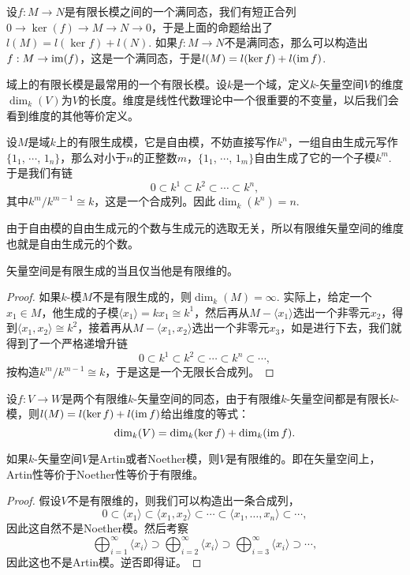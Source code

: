 设$f:M\to N$是有限长模之间的一个满同态，我们有短正合列$0\to \ker(f)\to M\to N\to 0$，于是上面的命题给出了$l(M)=l(\ker f)+l(N)$. 如果$f:M\to N$不是满同态，那么可以构造出$f:M\to \operatorname{im}(f)$，这是一个满同态，于是$l(M)=l(\ker f)+l(\operatorname{im} f)$. 

\para[矢量空间维度] 域上的有限长模是最常用的一个有限长模。设$k$是一个域，定义$k$-矢量空间$V$的维度$\dim_k(V)$为$V$的长度。维度是线性代数理论中一个很重要的不变量，以后我们会看到维度的其他等价定义。

设$M$是域$k$上的有限生成模，它是自由模，不妨直接写作$k^n$，一组自由生成元写作$\{1_1$, $\cdots$, $1_n\}$，那么对小于$n$的正整数$m$，$\{1_1$, $\cdots$, $1_m\}$自由生成了它的一个子模$k^m$. 于是我们有链
\[
	0\subset k^1\subset  k^2 \subset \cdots \subset k^n,
\]
其中$k^m/k^{m-1}\cong k$，这是一个合成列。因此$\dim_k(k^n)=n$. 

由于自由模的自由生成元的个数与生成元的选取无关，所以有限维矢量空间的维度也就是自由生成元的个数。

\begin{pro}
	矢量空间是有限生成的当且仅当他是有限维的。
\end{pro}

\begin{proof}
如果$k$-模$M$不是有限生成的，则$\dim_k(M)=\infty$. 实际上，给定一个$x_1\in M$，他生成的子模$\langle x_1\rangle=kx_1\cong k^1$，然后再从$M-\langle x_1\rangle$选出一个非零元$x_2$，得到$\langle x_1,x_2\rangle\cong k^2$，接着再从$M-\langle x_1,x_2\rangle$选出一个非零元$x_3$，如是进行下去，我们就得到了一个严格递增升链
\[
	0\subset k^1\subset k^2\subset \cdots \subset k^n\subset \cdots,
\]
按构造$k^m/k^{m-1}\cong k$，于是这是一个无限长合成列。
\end{proof}

\begin{pro}[线性代数基本定理]
设$f:V\to W$是两个有限维$k$-矢量空间的同态，由于有限维$k$-矢量空间都是有限长$k$-模，则$l(M)=l(\ker f)+l(\operatorname{im} f)$给出维度的等式：
\[
	\dim_k(V)=\dim_k(\ker f)+\dim_k(\operatorname{im} f).
\]
\end{pro}

\begin{pro}
如果$k$-矢量空间$V$是Artin或者Noether模，则$V$是有限维的。即在矢量空间上，Artin性等价于Noether性等价于有限维。
\end{pro}

\begin{proof}
	假设$V$不是有限维的，则我们可以构造出一条合成列，
	\[
	0\subset \langle x_1\rangle\subset \langle x_1,x_2\rangle\subset \cdots \subset \langle x_1,\dots,x_n\rangle\subset \cdots,
	\]
	因此这自然不是Noether模。然后考察
	\[
		\bigoplus_{i=1}^\infty \langle x_i\rangle \supset \bigoplus_{i=2}^\infty \langle x_i\rangle \supset \bigoplus_{i=3}^\infty \langle x_i\rangle\supset \cdots,
	\]
	因此这也不是Artin模。逆否即得证。
\end{proof}

